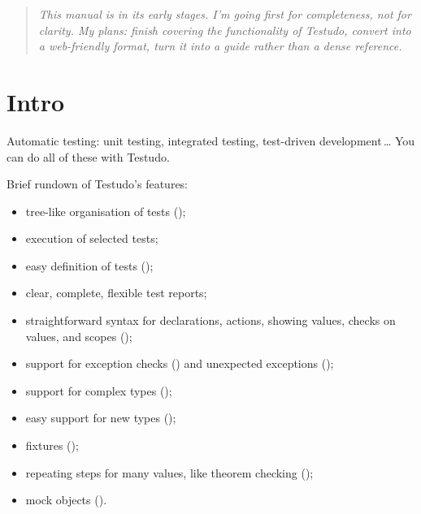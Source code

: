 \documentclass[twoside, a4paper, article]{memoir}
\newcommand*\ellipsis{\,\ldots}
\begin{document}
\thispagestyle{empty}

\cleardoublepage

\frontmatter

\maketitle

\tableofcontents*
\listoffigures*
\listoftables*

\cleartooddpage

\begin{quote}
  \emph{This manual is in its early stages.  I'm going first for completeness,
    not for clarity.  My plans: finish covering the functionality of Testudo,
    convert into a web-friendly format, turn it into a guide rather than a
    dense reference.}
\end{quote}

\chapter{Intro}
\label{cha:intro}

Automatic testing: unit testing, integrated testing, test-driven
development\ellipsis{}  You can do all of these with Testudo.

Brief rundown of Testudo's features:
\begin{itemize}
\item tree-like organisation of tests ();
\item execution of selected tests;
\item easy definition of tests ();
\item clear, complete, flexible test reports;
\item straightforward syntax for declarations, actions, showing values, checks
  on values, and scopes ();
\item support for exception checks () and unexpected
  exceptions ();
\item support for complex types ();
\item easy support for new types ();
\item fixtures ();
\item repeating steps for many values, like theorem checking
  ();
\item mock objects ().
\end{itemize}
\end{document}
